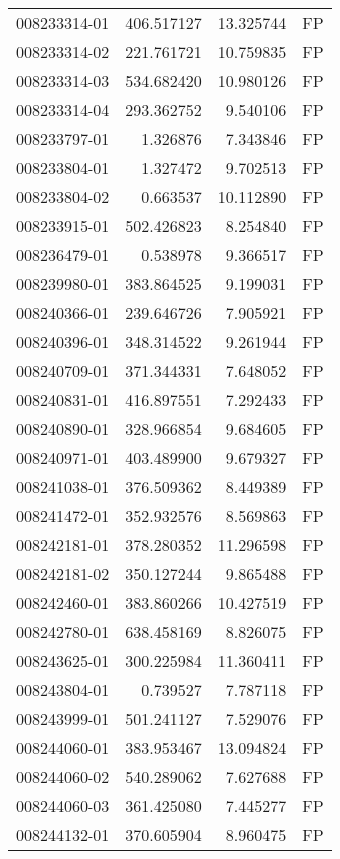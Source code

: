 \begin{tabular}{lrrl}
008233314-01 &  406.517127 &    13.325744 &   FP \\
008233314-02 &  221.761721 &    10.759835 &   FP \\
008233314-03 &  534.682420 &    10.980126 &   FP \\
008233314-04 &  293.362752 &     9.540106 &   FP \\
008233797-01 &    1.326876 &     7.343846 &   FP \\
008233804-01 &    1.327472 &     9.702513 &   FP \\
008233804-02 &    0.663537 &    10.112890 &   FP \\
008233915-01 &  502.426823 &     8.254840 &   FP \\
008236479-01 &    0.538978 &     9.366517 &   FP \\
008239980-01 &  383.864525 &     9.199031 &   FP \\
008240366-01 &  239.646726 &     7.905921 &   FP \\
008240396-01 &  348.314522 &     9.261944 &   FP \\
008240709-01 &  371.344331 &     7.648052 &   FP \\
008240831-01 &  416.897551 &     7.292433 &   FP \\
008240890-01 &  328.966854 &     9.684605 &   FP \\
008240971-01 &  403.489900 &     9.679327 &   FP \\
008241038-01 &  376.509362 &     8.449389 &   FP \\
008241472-01 &  352.932576 &     8.569863 &   FP \\
008242181-01 &  378.280352 &    11.296598 &   FP \\
008242181-02 &  350.127244 &     9.865488 &   FP \\
008242460-01 &  383.860266 &    10.427519 &   FP \\
008242780-01 &  638.458169 &     8.826075 &   FP \\
008243625-01 &  300.225984 &    11.360411 &   FP \\
008243804-01 &    0.739527 &     7.787118 &   FP \\
008243999-01 &  501.241127 &     7.529076 &   FP \\
008244060-01 &  383.953467 &    13.094824 &   FP \\
008244060-02 &  540.289062 &     7.627688 &   FP \\
008244060-03 &  361.425080 &     7.445277 &   FP \\
008244132-01 &  370.605904 &     8.960475 &   FP \\

\end{tabular}
